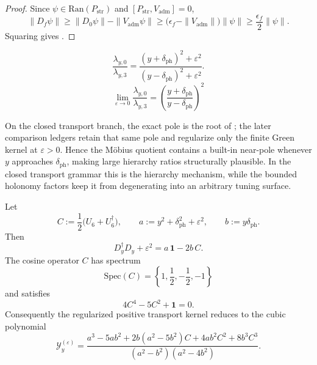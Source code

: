\begin{proof}
Since $\psi\in\mathrm{Ran}(P_{\mathrm{str}})$ and $[P_{\mathrm{str}},V_{\mathrm{adm}}]=0$,
\[
\|D_f\psi\|
\ge
\|D_0\psi\|-\|V_{\mathrm{adm}}\psi\|
\ge
\bigl(\epsilon_f-\|V_{\mathrm{adm}}\|\bigr)\|\psi\|
\ge
\frac{\epsilon_f}{2}\|\psi\|.
\]
Squaring gives .
\end{proof}

\begin{equation}
\label{eq:mobius-quotient}
\frac{\lambda_{y,0}}{\lambda_{y,3}}
=
\frac{(y+\delta_{\mathrm{ph}})^2+\varepsilon^2}{(y-\delta_{\mathrm{ph}})^2+\varepsilon^2}.
\end{equation}
\[
\lim_{\varepsilon\to 0}\frac{\lambda_{y,0}}{\lambda_{y,3}}
=
\left(\frac{y+\delta_{\mathrm{ph}}}{y-\delta_{\mathrm{ph}}}\right)^2
\]
\begin{remark}
On the closed transport branch, the exact pole is the root of
; the later comparison ledgers retain that same pole and
regularize only the finite Green kernel at $\varepsilon>0$.
Hence the Möbius quotient contains a built-in near-pole whenever $y$ approaches $\delta_{\mathrm{ph}}$, making large hierarchy ratios structurally plausible. In the closed transport grammar this is the hierarchy mechanism, while the bounded holonomy factors keep it from degenerating into an arbitrary tuning surface.
\end{remark}

\begin{proposition}
\label{prop:finite-positive-transport-algebra}
Let
\[
C:=\frac12\bigl(U_6+U_6^\dagger\bigr),
\qquad
a:=y^2+\delta_{\mathrm{ph}}^2+\varepsilon^2,
\qquad
b:=y\delta_{\mathrm{ph}}.
\]
Then
\[
D_y^\dagger D_y+\varepsilon^2=a\,\mathbf 1-2b\,C.
\]
The cosine operator $C$ has spectrum
\[
\mathrm{Spec}(C)=\left\{1,\frac12,-\frac12,-1\right\}
\]
and satisfies
\begin{equation}
\label{eq:c6-cosine-polynomial}
4C^4-5C^2+\mathbf 1=0.
\end{equation}
Consequently the regularized positive transport kernel reduces to the cubic polynomial
\begin{equation}
\label{eq:finite-positive-transport-kernel}
\mathcal Y_y^{(\varepsilon)}
=
\frac{
a^3-5ab^2
+2b(a^2-5b^2)C
+4ab^2C^2
+8b^3C^3
}{
(a^2-b^2)(a^2-4b^2)
}.
\end{equation}
\end{proposition}

